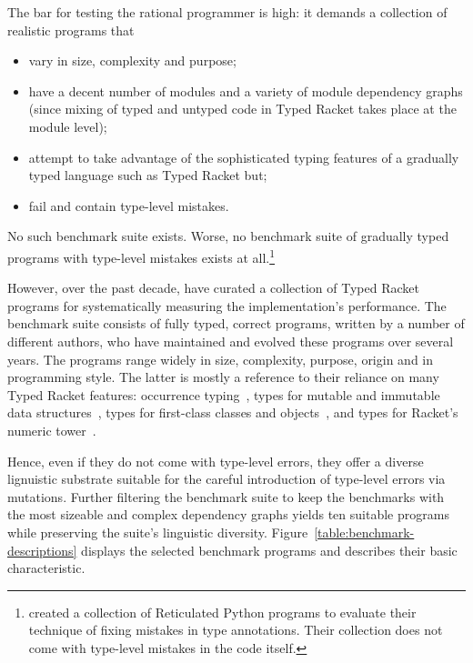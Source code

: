 
The bar for testing the rational programmer is high: it demands a
collection of realistic programs that
\begin{itemize}
   
  \item vary in size, complexity and purpose; 
    
  \item  have a decent number of modules and a variety of module
    dependency graphs (since mixing of typed and untyped code in Typed
    Racket takes place at the module level);  

  \item attempt to take  advantage of the sophisticated typing features of
    a gradually typed language such as Typed Racket but;

   \item  fail and contain type-level mistakes. 
\end{itemize}

No such benchmark suite exists.  Worse, no benchmark suite of
gradually typed programs with type-level mistakes exists at
all.\footnote{\citet{cc-oopsla-20} created a collection of Reticulated
Python programs to evaluate their technique of fixing mistakes in type
annotations. Their collection does not come with type-level mistakes
in the code itself.} 


However, over the past decade,  \citet{gtnffvf-jfp-2019} have curated a
collection of Typed Racket programs for systematically measuring the
implementation's performance. The benchmark suite consists of fully typed,
correct programs, written by a number of different authors, who have
maintained and evolved these programs over several years. The programs
range widely in size, complexity, purpose, origin and in programming
style. The latter is mostly a reference to their reliance on many Typed
Racket features: occurrence typing~\cite{tf-icfp-2010}, types for mutable
and immutable data structures~\cite{hpst-sfp-2010}, types for first-class
classes and objects~\cite{tsdtf-oopsla-2012}, and types for Racket's
numeric tower~\cite{stathff-padl-12}. 


Hence, even if they do not come with type-level errors, they offer a
diverse lignuistic substrate suitable for the careful introduction of
type-level errors via mutations. Further filtering the benchmark suite to
keep the benchmarks with the most sizeable and complex dependency graphs
yields ten suitable programs while preserving the suite's linguistic
diversity. Figure~\ref{table:benchmark-descriptions} displays the selected
benchmark programs and describes their basic characteristic. 
